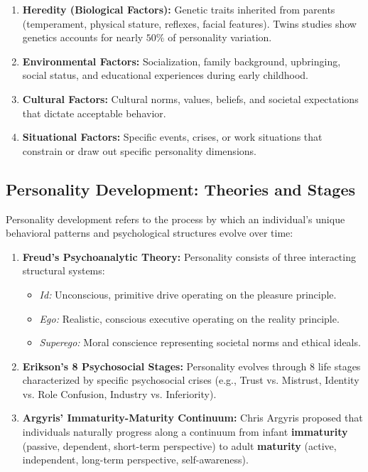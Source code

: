 \documentclass[11pt,a4paper]{article}
\begin{document}
\begin{enumerate}[leftmargin=*, itemsep=4pt]
  \item \textbf{Heredity (Biological Factors):} Genetic traits inherited from parents (temperament, physical stature, reflexes, facial features). Twins studies show genetics accounts for nearly $50\%$ of personality variation.
  \item \textbf{Environmental Factors:} Socialization, family background, upbringing, social status, and educational experiences during early childhood.
  \item \textbf{Cultural Factors:} Cultural norms, values, beliefs, and societal expectations that dictate acceptable behavior.
  \item \textbf{Situational Factors:} Specific events, crises, or work situations that constrain or draw out specific personality dimensions.
\end{enumerate}

\subsection{Personality Development: Theories and Stages}
Personality development refers to the process by which an individual's unique behavioral patterns and psychological structures evolve over time:

\begin{enumerate}[leftmargin=*, itemsep=4pt]
  \item \textbf{Freud's Psychoanalytic Theory:} Personality consists of three interacting structural systems:
    \begin{itemize}[leftmargin=*, noitemsep]
      \item \textit{Id:} Unconscious, primitive drive operating on the pleasure principle.
      \item \textit{Ego:} Realistic, conscious executive operating on the reality principle.
      \item \textit{Superego:} Moral conscience representing societal norms and ethical ideals.
    \end{itemize}
  \item \textbf{Erikson's 8 Psychosocial Stages:} Personality evolves through 8 life stages characterized by specific psychosocial crises (e.g., Trust vs. Mistrust, Identity vs. Role Confusion, Industry vs. Inferiority).
  \item \textbf{Argyris' Immaturity-Maturity Continuum:} Chris Argyris proposed that individuals naturally progress along a continuum from infant \textbf{immaturity} (passive, dependent, short-term perspective) to adult \textbf{maturity} (active, independent, long-term perspective, self-awareness).
\end{enumerate}
\end{document}
